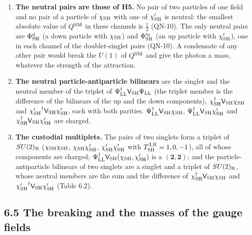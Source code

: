\documentclass[
  10pt,
]{article}
\begin{document}
\begin{enumerate}
  number (QN-9; the Wolfram script checks the infinitesimal form
  exactly): the interaction (c) of consequence 3 respects every symmetry
  of the Lagrangian except the particle number.
\item
  \textbf{The neutral pairs are those of H5.} No pair of two particles
  of one field and no pair of a particle of \(\chi_{\rm SH}\) with one
  of \(\chi'_{\rm SH}\) is neutral: the smallest absolute value of
  \(Q^{\rm SM}\) in these channels is \(\tfrac12\) (QN-10). The only
  neutral pairs are \(\Phi^{\rm d}_{\rm SH}\) (a down particle with
  \(\chi_{\rm SH}\)) and \(\Phi'^{\rm u}_{\rm SH}\) (an up particle with
  \(\chi'_{\rm SH}\)), one in each channel of the doublet-singlet pairs
  (QN-10). A condensate of any other pair would break the \(U(1)\) of
  \(Q^{\rm SM}\) and give the photon a mass, whatever the strength of
  the attraction.
\item
  \textbf{The neutral particle-antiparticle bilinears} are the singlet
  and the neutral member of the triplet of
  \(\Psi^\dagger_{\rm LL}\mathsf V_{\rm SH}\Psi_{\rm LL}\) (the triplet
  member is the difference of the bilinears of the up and the down
  components), \(\chi^\dagger_{\rm SH}\mathsf V_{\rm SH}\chi_{\rm SH}\)
  and \({\chi'_{\rm SH}}^\dagger\mathsf V_{\rm SH}\chi'_{\rm SH}\), each
  with both parities.
  \(\Psi^\dagger_{\rm LL}\mathsf V_{\rm SH}\chi_{\rm SH}\),
  \(\Psi^\dagger_{\rm LL}\mathsf V_{\rm SH}\chi'_{\rm SH}\) and
  \(\chi^\dagger_{\rm SH}\mathsf V_{\rm SH}\chi'_{\rm SH}\) are charged.
\item
  \textbf{The custodial multiplets.} The pairs of two singlets form a
  triplet of \(SU(2)_{\rm R}\) (\(\chi_{\rm SH}\chi_{\rm SH}\),
  \(\chi_{\rm SH}\chi'_{\rm SH}\), \(\chi'_{\rm SH}\chi'_{\rm SH}\) with
  \(T^{3,{\rm R}}_{\rm SH}=1,0,-1\)), all of whose components are
  charged;
  \(\Psi^\dagger_{\rm LL}\mathsf V_{\rm SH}(\chi_{\rm SH},\chi'_{\rm SH})\)
  is a \((\mathbf 2,\mathbf 2)\); and the particle-antiparticle
  bilinears of two singlets are a singlet and a triplet of
  \(SU(2)_{\rm R}\), whose neutral members are the sum and the
  difference of \(\chi^\dagger_{\rm SH}\mathsf V_{\rm SH}\chi_{\rm SH}\)
  and \({\chi'_{\rm SH}}^\dagger\mathsf V_{\rm SH}\chi'_{\rm SH}\)
  (Table 6.2).
\end{enumerate}

\hypertarget{the-breaking-and-the-masses-of-the-gauge-fields}{%
\subsection{6.5 The breaking and the masses of the gauge
fields}\label{the-breaking-and-the-masses-of-the-gauge-fields}}
\end{document}
